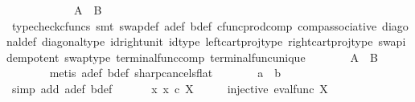 \begin{isabellebody}
\isanewline
\ \ \ \ \isamarkupfalse%
\isanewline
\ \ \ \ \isamarkupfalse%
\ \isamarkupfalse%
\ {\isachardoublequoteopen}A\isactrlsup {\isasymflat}\ {\isacharequal}{\kern0pt}\ B\isactrlsup {\isasymflat}{\isachardoublequoteclose}\isanewline
\ \ \ \ \ \ \isamarkupfalse%
\ {\isacharparenleft}{\kern0pt}typecheck{\isacharunderscore}{\kern0pt}cfuncs{\isacharcomma}{\kern0pt}\ smt\ swap{\isacharunderscore}{\kern0pt}def\ a{\isacharunderscore}{\kern0pt}def\ b{\isacharunderscore}{\kern0pt}def\ cfunc{\isacharunderscore}{\kern0pt}prod{\isacharunderscore}{\kern0pt}comp\ comp{\isacharunderscore}{\kern0pt}associative{}\ diagonal{\isacharunderscore}{\kern0pt}def\ diagonal{\isacharunderscore}{\kern0pt}type\ id{\isacharunderscore}{\kern0pt}right{\isacharunderscore}{\kern0pt}unit{}\ id{\isacharunderscore}{\kern0pt}type\ left{\isacharunderscore}{\kern0pt}cart{\isacharunderscore}{\kern0pt}proj{\isacharunderscore}{\kern0pt}type\ right{\isacharunderscore}{\kern0pt}cart{\isacharunderscore}{\kern0pt}proj{\isacharunderscore}{\kern0pt}type\ swap{\isacharunderscore}{\kern0pt}idempotent\ swap{\isacharunderscore}{\kern0pt}type\ terminal{\isacharunderscore}{\kern0pt}func{\isacharunderscore}{\kern0pt}comp\ terminal{\isacharunderscore}{\kern0pt}func{\isacharunderscore}{\kern0pt}unique{\isacharparenright}{\kern0pt}\isanewline
\ \ \ \ \isamarkupfalse%
\ \isamarkupfalse%
\ {\isachardoublequoteopen}A\ {\isacharequal}{\kern0pt}\ B{\isachardoublequoteclose}\isanewline
\ \ \ \ \ \ \isamarkupfalse%
\ {\isacharparenleft}{\kern0pt}metis\ a{\isacharunderscore}{\kern0pt}def\ b{\isacharunderscore}{\kern0pt}def\ sharp{\isacharunderscore}{\kern0pt}cancels{\isacharunderscore}{\kern0pt}flat{\isacharparenright}{\kern0pt}\isanewline
\ \ \ \ \isamarkupfalse%
\ \isamarkupfalse%
\ {\isachardoublequoteopen}a\ {\isacharequal}{\kern0pt}\ b{\isachardoublequoteclose}\isanewline
\ \ \ \ \ \ \isamarkupfalse%
\ {\isacharparenleft}{\kern0pt}simp\ add{\isacharcolon}{\kern0pt}\ a{\isacharunderscore}{\kern0pt}def\ b{\isacharunderscore}{\kern0pt}def{\isacharparenright}{\kern0pt}\isanewline
\ \ \isamarkupfalse%
\isanewline
{}\isamarkupfalse%
\isanewline
\ \ \isamarkupfalse%
\ {\isachardoublequoteopen}{\isasymnexists}x{\isachardot}{\kern0pt}\ x\ {\isasymin}\isactrlsub c\ X{\isachardoublequoteclose}\isanewline
\ \ \isamarkupfalse%
\ \isamarkupfalse%
\ {\isachardoublequoteopen}injective\ {\isacharparenleft}{\kern0pt}eval{\isacharunderscore}{\kern0pt}func\ X\ {\isasymone}{\isacharparenright}{\kern0pt}{\isachardoublequoteclose}\isanewline

\end{isabellebody}

